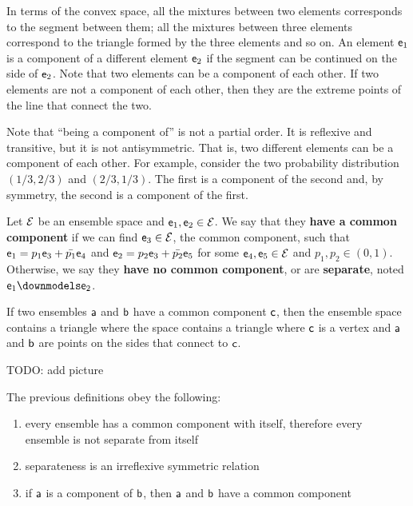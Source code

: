 \begin{remark}
	In terms of the convex space, all the mixtures between two elements corresponds to the segment between them; all the mixtures between three elements correspond to the triangle formed by the three elements and so on. An element $\ens_1$ is a component of a different element $\ens_2$ if the segment can be continued on the side of $\ens_2$. Note that two elements can be a component of each other. If two elements are not a component of each other, then they are the extreme points of the line that connect the two.
\end{remark}

\begin{remark}
	Note that ``being a component of'' is not a partial order. It is reflexive and transitive, but it is not antisymmetric. That is, two different elements can be a component of each other. For example, consider the two probability distribution $(1/3, 2/3)$ and $(2/3, 1/3)$. The first is a component of the second and, by symmetry, the second is a component of the first.
\end{remark}


\begin{defn}
	Let $\Ens$ be an ensemble space and $\ens_1, \ens_2 \in \Ens$. We say that they \textbf{have a common component} if we can find $\ens_3 \in \Ens$, the common component, such that $\ens_1 = p_1 \ens_3 + \bar{p_1} \ens_4$ and $\ens_2 = p_2 \ens_3 + \bar{p_2} \ens_5$ for some $\ens_4, \ens_5 \in \Ens$ and $p_1, p_2 \in (0,1)$. Otherwise, we say they \textbf{have no common component}, or are \textbf{separate}, noted $\ens_1 \distinct \ens_2$.
\end{defn}

\begin{remark}
	If two ensembles $\ens[a]$ and $\ens[b]$ have a common component $\ens[c]$, then the ensemble space contains a triangle where the space contains a triangle where $\ens[c]$ is a vertex and $\ens[a]$ and $\ens[b]$ are points on the sides that connect to $\ens[c]$.
	
	TODO: add picture
\end{remark}

\begin{coro}
	The previous definitions obey the following:
	\begin{enumerate}
		\item every ensemble has a common component with itself, therefore every ensemble is not separate from itself
		\item separateness is an irreflexive symmetric relation
		\item if $\ens[a]$ is a component of $\ens[b]$, then $\ens[a]$ and $\ens[b]$ have a common component
	\end{enumerate}
\end{coro}

